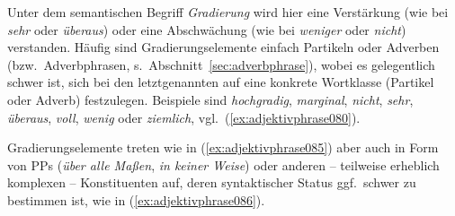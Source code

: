 

Unter dem semantischen Begriff \textit{Gradierung} wird hier eine Verstärkung (wie bei \textit{sehr} oder \textit{überaus}) oder eine Abschwächung (wie bei \textit{weniger} oder \textit{nicht}) verstanden.
Häufig sind Gradierungselemente einfach Partikeln oder Adverben (bzw.\ Adverbphrasen, s.\ Abschnitt~\ref{sec:adverbphrase}), wobei es gelegentlich schwer ist, sich bei den letztgenannten auf eine konkrete Wortklasse (Partikel oder Adverb) festzulegen.
Beispiele sind \textit{hochgradig}, \textit{marginal}, \textit{nicht}, \textit{sehr}, \textit{überaus}, \textit{voll}, \textit{wenig} oder \textit{ziemlich}, vgl.\ (\ref{ex:adjektivphrase080}).


\begin{exe}
  \ex\label{ex:adjektivphrase080}
  \begin{xlist}
  \end{xlist}
\end{exe}


Gradierungselemente treten wie in (\ref{ex:adjektivphrase085}) aber auch in Form von PPs (\zB \textit{über alle Maßen}, \textit{in keiner Weise}) oder anderen -- teilweise erheblich komplexen -- Konstituenten auf, deren syntaktischer Status ggf.\ schwer zu bestimmen ist, wie in (\ref{ex:adjektivphrase086}).


\begin{exe}
  \ex\label{ex:adjektivphrase084}
  \begin{xlist}
  \end{xlist}
\end{exe}


